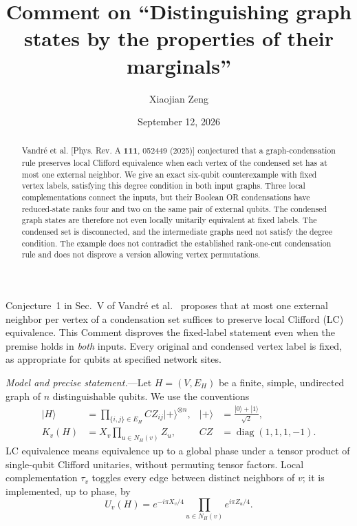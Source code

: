 \documentclass[aps,pra,reprint,amsmath,amssymb,longbibliography]{revtex4-2}
\begin{document}
\title{Comment on ``Distinguishing graph states by the properties of their marginals''}
\author{Xiaojian Zeng}
\date{September 12, 2026}
\begin{abstract}
Vandr\'e et al. [Phys. Rev. A \textbf{111}, 052449 (2025)] conjectured that a graph-condensation rule preserves local Clifford equivalence when each vertex of the condensed set has at most one external neighbor. We give an exact six-qubit counterexample with fixed vertex labels, satisfying this degree condition in both input graphs. Three local complementations connect the inputs, but their Boolean OR condensations have reduced-state ranks four and two on the same pair of external qubits. The condensed graph states are therefore not even locally unitarily equivalent at fixed labels. The condensed set is disconnected, and the intermediate graphs need not satisfy the degree condition. The example does not contradict the established rank-one-cut condensation rule and does not disprove a version allowing vertex permutations.
\end{abstract}
\maketitle

Conjecture~1 in Sec.~V of Vandr\'e et al.~\cite{Vandre2025} proposes that at most one external neighbor per vertex of a condensation set suffices to preserve local Clifford (LC) equivalence. This Comment disproves the fixed-label statement even when the premise holds in \emph{both} inputs. Every original and condensed vertex label is fixed, as appropriate for qubits at specified network sites.

\emph{Model and precise statement.}---Let $H=(V,E_H)$ be a finite, simple, undirected graph of $n$ distinguishable qubits. We use the conventions
\begin{align}
 |H\rangle&=\prod_{\{i,j\}\in E_H}CZ_{ij}|+\rangle^{\otimes n},
 &|+\rangle&=\frac{|0\rangle+|1\rangle}{\sqrt2},\label{eq:state}\\
 K_v(H)&=X_v\prod_{u\in N_H(v)}Z_u,
 &CZ&=\operatorname{diag}(1,1,1,-1).\nonumber
\end{align}
LC equivalence means equivalence up to a global phase under a tensor product of single-qubit Clifford unitaries, without permuting tensor factors. Local complementation $\tau_v$ toggles every edge between distinct neighbors of $v$; it is implemented, up to phase, by~\cite{Vandre2025}
\begin{equation}
 U_v(H)=e^{-i\pi X_v/4}\prod_{u\in N_H(v)}e^{i\pi Z_u/4}.
 \label{eq:unitary}
\end{equation}
\end{document}
